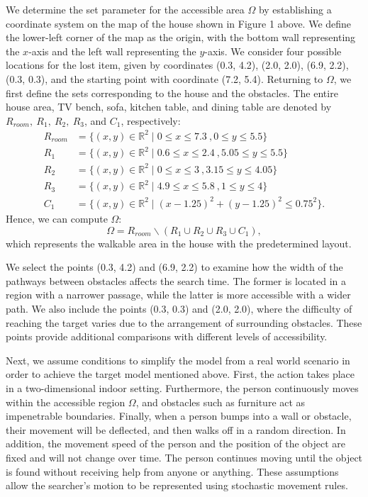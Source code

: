 \documentclass{article}
\begin{document}
\noindent We determine the set parameter for the accessible area $\Omega$ by establishing a coordinate system on the map of the house shown in Figure 1 above. We define the lower-left corner of the map as the origin, with the bottom wall representing the $x$-axis and the left wall representing the $y$-axis. We consider four possible locations for the lost item, given by coordinates (0.3, 4.2), (2.0, 2.0), (6.9, 2.2), (0.3, 0.3), and the starting point with coordinate (7.2, 5.4). Returning to $\Omega$, we first define the sets corresponding to the house and the obstacles. The entire house area, TV bench, sofa, kitchen table, and dining table are denoted by $R_{room},\ R_1,\ R_2,\ R_3$, and $C_1$, respectively:
\begin{align*}
R_{room} &=\{(x,y) \in \mathbb{R}^2\mid 0 \le x \le 7.3 \ , 0 \le y \le 5.5\} \\
R_1 &= \{(x,y) \in \mathbb{R}^2\mid 0.6 \le x \le 2.4 \ , 5.05 \le y \le 5.5 \} \\
R_2 &= \{(x,y) \in \mathbb{R}^2\mid 0 \le x \le 3 \ , 3.15 \le y \le 4.05 \} \tag{2.1} \\
R_3 &= \{(x,y) \in \mathbb{R}^2\mid 4.9 \le x \le 5.8 \ , 1 \le y \le 4 \} \\ 
C_1 &= \{(x,y) \in \mathbb{R}^2\mid (x - 1.25)^2 + (y-1.25)^2 \le 0.75^2 \} .
\end{align*}
Hence, we can compute $\Omega$:
$$
\Omega = R_{room} \backslash (R_1 \cup R_2 \cup R_3 \cup C_1),
$$
which represents the walkable area in the house with the predetermined layout.

\vspace{5mm}

\noindent We select the points (0.3, 4.2) and (6.9, 2.2) to examine how the width of the pathways between obstacles affects the search time. The former is located in a region with a narrower passage, while the latter is more accessible with a wider path. We also include the points (0.3, 0.3) and (2.0, 2.0), where the difficulty of reaching the target varies due to the arrangement of surrounding obstacles. These points provide additional comparisons with different levels of accessibility. 

\vspace{5mm}

\noindent Next, we assume conditions to simplify the model from a real world scenario in order to achieve the target model mentioned above. First, the action takes place in a two-dimensional indoor setting. Furthermore, the person continuously moves within the accessible region $\Omega$, and obstacles such as furniture act as impenetrable boundaries. Finally, when a person bumps into a wall or obstacle, their movement will be deflected, and then walks off in a random direction. In addition, the movement speed of the person and the position of the object are fixed and will not change over time. The person continues moving until the object is found without receiving help from anyone or anything. These assumptions allow the searcher's motion to be represented using stochastic movement rules.
\end{document}
